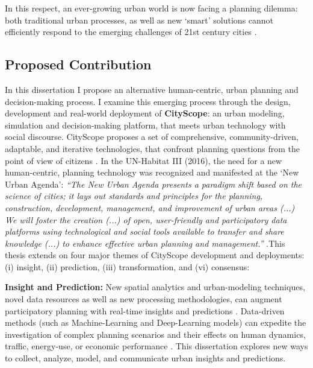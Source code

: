 {In this respect, an ever-growing urban world is now facing a planning dilemma: both traditional urban processes, as well as new `smart' solutions cannot efficiently respond to the emerging challenges of 21st century cities \cite{soderstrom2014smart}.}

 

\subsection{Proposed Contribution}

{In this dissertation I propose an alternative human-centric, urban planning and decision-making process. I examine this emerging process through the design, development and real-world deployment of \textbf{CityScope}: an urban modeling, simulation and decision-making platform, that meets urban technology with social discourse. CityScope proposes a set of comprehensive, community-driven, adaptable, and iterative technologies, that confront planning questions from the point of view of citizens \cite{batty2013new, habitat2016new}. In the UN-Habitat III (2016), the need for a new human-centric, planning technology was recognized and manifested at the `New Urban Agenda': {\textit{``The New Urban Agenda presents a paradigm shift based on the science of cities; it lays out standards and principles for the planning, construction, development, management, and improvement of urban areas (...) We will foster the creation (...) of open, user-friendly and participatory data platforms using technological and social tools available to transfer and share knowledge (...) to enhance effective urban planning and management.''}} \cite{habitat2016new}.This thesis extends on four major themes of CityScope development and deployments: (i) insight, (ii) prediction, (iii) transformation, and (vi) consensus:}

{\textbf{Insight and Prediction:} New spatial analytics and urban-modeling techniques, novel data resources as well as new processing methodologies, can augment participatory planning with real-time insights and predictions \cite{salganik_bit_2017, Kitchin2014, Ben-Joseph2001}. Data-driven methods (such as Machine-Learning and Deep-Learning models) can expedite the investigation of complex planning scenarios and their effects on human dynamics, traffic, energy-use, or economic performance \cite{Foth2011, Song2010}. This dissertation explores new ways to collect, analyze, model, and communicate urban insights and predictions.} 

